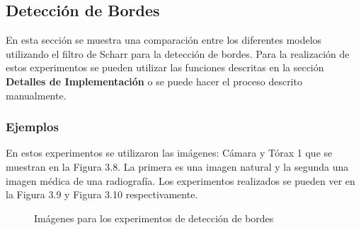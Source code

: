 \subsection{Detecci\'on de Bordes}

En esta secci\'on se muestra una comparaci\'on entre los diferentes modelos utilizando el filtro de Scharr para la detecci\'on de bordes. Para la realizaci\'on de estos experimentos se pueden utilizar las funciones descritas en la secci\'on \textbf{Detalles de Implementaci\'on} o se puede hacer el proceso descrito manualmente. 

\subsubsection{Ejemplos}

En estos experimentos se utilizaron las im\'agenes: C\'amara y T\'orax 1 que se muestran en la Figura 3.8. La primera es una imagen natural y la segunda una imagen m\'edica de una radiograf\'ia. Los experimentos realizados se pueden ver en la Figura 3.9 y Figura 3.10 respectivamente.

\begin{figure}
	\begin{center}
		\caption{Im\'agenes para los experimentos de detecci\'on de bordes}
	\end{center}
\end{figure}

